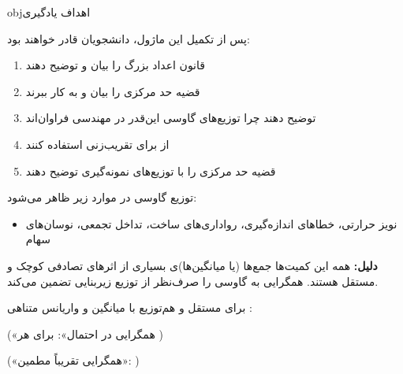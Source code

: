 \begin{PSbox}[unbreakable]{obj}{اهداف یادگیری}

پس از تکمیل این ماژول، دانشجویان قادر خواهند بود:

\begin{enumerate}
\def\labelenumi{\arabic{enumi}.}
\tightlist
\item
  قانون اعداد بزرگ را بیان و توضیح دهند
\item
  قضیه حد مرکزی را بیان و به کار ببرند
\item
  توضیح دهند چرا توزیع‌های گاوسی این‌قدر در مهندسی فراوان‌اند
\item
  از  برای تقریب‌زنی استفاده کنند
\item
  قضیه حد مرکزی را با توزیع‌های نمونه‌گیری توضیح دهند
\end{enumerate}

\end{PSbox}


توزیع گاوسی در موارد زیر ظاهر می‌شود:

\begin{itemize}
\tightlist
\item
  نویز حرارتی، خطاهای اندازه‌گیری، رواداری‌های ساخت، تداخل تجمعی، نوسان‌های سهام
\end{itemize}

\textbf{دلیل:} همه این کمیت‌ها جمع‌ها (یا میانگین‌ها)ی بسیاری از اثرهای تصادفی کوچک و مستقل هستند.  همگرایی به گاوسی را صرف‌نظر از توزیع زیربنایی تضمین می‌کند.



برای  مستقل و هم‌توزیع  با میانگین \lr{$\mu$} و واریانس متناهی :


(«همگرایی در احتمال»:  برای هر )



(«همگرایی تقریباً مطمین»: )

